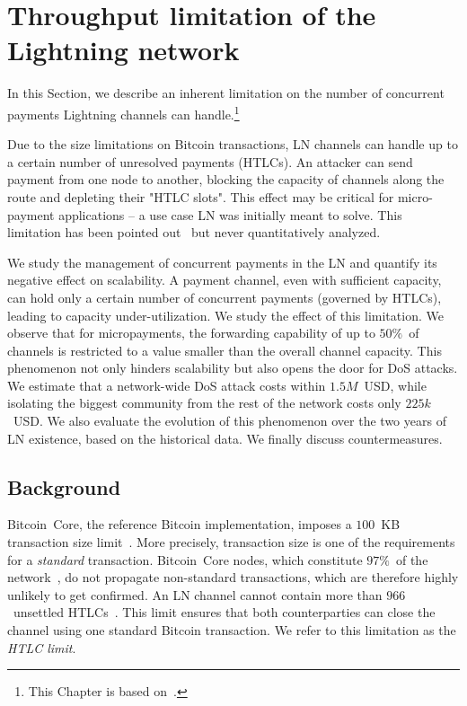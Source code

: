 \chapter{Throughput limitation of the Lightning network}

\label{Chapter08HTLClimit}

In this Section, we describe an inherent limitation on the number of concurrent payments Lightning channels can handle.\footnote{This Chapter is based on~\cite{Tikhomirov2020a}.}

Due to the size limitations on Bitcoin transactions, LN channels can handle up to a certain number of unresolved payments (HTLCs).
An attacker can send payment from one node to another, blocking the capacity of channels along the route and depleting their "HTLC slots".
This effect may be critical for micro-payment applications -- a use case LN was initially meant to solve.
This limitation has been pointed out~\cite{EmelyanenkoK2017} but never quantitatively analyzed.

We study the management of concurrent payments in the LN and quantify its negative effect on scalability.
A payment channel, even with sufficient capacity, can hold only a certain number of concurrent payments (governed by HTLCs), leading to capacity under-utilization.
We study the effect of this limitation.
We observe that for micropayments, the forwarding capability of up to $50\%$~of channels is restricted to a value smaller than the overall channel capacity.
This phenomenon not only hinders scalability but also opens the door for DoS attacks.
We estimate that a network-wide DoS attack costs within $1.5M$~USD, while isolating the biggest community from the rest of the network costs only $225k$~USD\@.
We also evaluate the evolution of this phenomenon over the two years of LN existence, based on the historical data.
We finally discuss countermeasures.


\section{Background} \label{max-htlc-background}

Bitcoin~Core, the reference Bitcoin implementation, imposes a $100$~KB transaction size limit~\cite{StandardTxBitcoinSE, BitcoinCoreMaxTxWeight}.
More precisely, transaction size is one of the requirements for a \textit{standard} transaction.
Bitcoin~Core nodes, which constitute $97\%$~of the network~\cite{CoinDance}, do not propagate non-standard transactions, which are therefore highly unlikely to get confirmed.
An LN channel cannot contain more than $966$~unsettled HTLCs~\cite{BOLT2Rationale}.
This limit ensures that both counterparties can close the channel using one standard Bitcoin transaction.
We refer to this limitation as the \textit{HTLC limit}.

